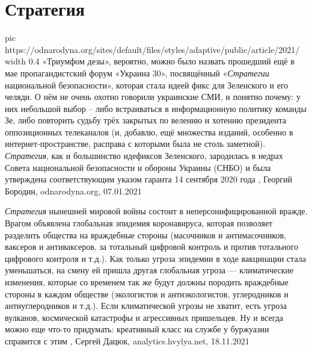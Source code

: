  
 
 
 
 
\chapter{Стратегия}
\label{sec:slova.strategia}

\ifcmt
  pic https://odnarodyna.org/sites/default/files/styles/adaptive/public/article/2021/%
	width 0.4
\fi
«Триумфом дезы», вероятно, можно было назвать прошедший ещё в мае
пропагандистский форум «Украина 30», посвящённый «\emph{Стратегии} национальной
безопасности», которая стала идеей фикс для Зеленского и его челяди. О нём не
очень охотно говорили украинские СМИ, и понятно почему: у них небольшой выбор –
либо встраиваться в информационную политику команды Зе, либо повторить судьбу
трёх закрытых по велению и хотению президента оппозиционных телеканалов (и,
добавлю, ещё множества изданий, особенно в интернет-пространстве, расправа с
которыми была не столь заметной).  \emph{Стратегия}, как и большинство
идефиксов Зеленского, зародилась в недрах Совета национальной безопасности и
обороны Украины (СНБО) и была утверждена соответствующим указом гаранта 14
сентября 2020 года
, Георгий Бородин, odnarodyna.org, 07.01.2021

\emph{Стратегия} нынешней мировой войны состоит в неперсонифицированной вражде. Врагом
объявлена глобальная эпидемия коронавируса, которая позволяет разделить
общества на враждебные стороны (масочников и антимасочников, ваксеров и
антиваксеров, за тотальный цифровой контроль и против тотального цифрового
контроля и т.д.).  Как только угроза эпидемии в ходе вакцинации стала
уменьшаться, на смену ей пришла другая глобальная угроза — климатические
изменения, которые со временем так же будут должны породить враждебные стороны
в каждом обществе (экологистов и антиэкологистов, углеродников и
антиуглеродников и т.д.).  Если климатической угрозы не хватит, есть угроза
вулканов, космической катастрофы и агрессивных пришельцев. Ну и всегда можно
еще что-то придумать: креативный класс на службе у буржуазии справится с этим
, Сергей Дацюк, analytics.hvylya.net, 18.11.2021
